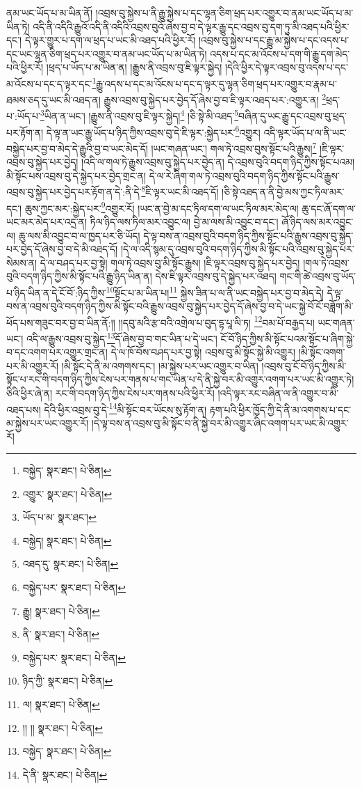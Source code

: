 ནམ་ཡང་ཡོད་པ་མ་ཡིན་ནོ། །འབྲས་བུ་སྐྱེས་པ་ནི་རྒྱུ་སྐྱེས་པ་དང་ལྷན་ཅིག་ཕྲད་པར་འགྱུར་བ་ནམ་ཡང་ཡོད་པ་མ་ཡིན་ཏེ། འདི་ནི་འདིའི་རྒྱུའོ་འདི་ནི་འདིའི་འབྲས་བུའོ་ཞེས་བྱ་བ་དེ་ལྟར་རྒྱུ་དང་འབྲས་བུ་དག་ཏུ་མི་འཐད་པའི་ཕྱིར་དང་། དེ་ལྟར་གྱུར་པ་དག་ལ་ཕྲད་པ་ཡང་མི་འཐད་པའི་ཕྱིར་རོ། །འབྲས་བུ་སྐྱེས་པ་དང་རྒྱུ་མ་སྐྱེས་པ་དང་འདས་པ་དང་ཡང་ལྷན་ཅིག་ཕྲད་པར་འགྱུར་བ་ནམ་ཡང་ཡོད་པ་མ་ཡིན་ཏེ། འདས་པ་དང་མ་འོངས་པ་དག་གི་རྒྱུ་དག་མེད་པའི་ཕྱིར་རོ། །ཕྲད་པ་ཡོད་པ་མ་ཡིན་ན། །རྒྱུས་ནི་འབྲས་བུ་ཇི་ལྟར་སྐྱེད། །དེའི་ཕྱིར་དེ་ལྟར་འབྲས་བུ་འདས་པ་དང་མ་འོངས་པ་དང་ད་ལྟར་དང་\footnote{བསྐྱེད་  སྣར་ཐང་།  པེ་ཅིན། }རྒྱུ་འདས་པ་དང་མ་འོངས་པ་དང་ད་ལྟར་དུ་ལྷན་ཅིག་ཕྲད་པར་འགྱུར་བ་རྣམ་པ་ཐམས་ཅད་དུ་ཡང་མི་འཐད་ན། རྒྱུས་འབྲས་བུ་སྐྱེད་པར་བྱེད་དོ་ཞེས་བྱ་བ་ཇི་ལྟར་འཐད་པར་:འགྱུར་ན། \footnote{འགྱུར་  སྣར་ཐང་།  པེ་ཅིན། }ཕྲད་པ་:ཡོད་པ་\footnote{ཡོད་པ་མ་  སྣར་ཐང་། }ཡིན་ན་ཡང་། །རྒྱུས་ནི་འབྲས་བུ་ཇི་ལྟར་སྐྱེད།\footnote{བསྐྱེད།  སྣར་ཐང་།  པེ་ཅིན། } །ཅི་སྟེ་མི་འཐད་\footnote{འཐད་དུ་  སྣར་ཐང་།  པེ་ཅིན། }བཞིན་དུ་ཡང་རྒྱུ་དང་འབྲས་བུ་ཕྲད་པར་རྟོག་ན། དེ་ལྟ་ན་ཡང་རྒྱུ་ཡོད་པ་ཉིད་ཀྱིས་འབྲས་བུ་དེ་ཇི་ལྟར་:སྐྱེད་པར་\footnote{བསྐྱེད་པར་  སྣར་ཐང་།  པེ་ཅིན། }འགྱུར། འདི་ལྟར་ཡོད་པ་ལ་ནི་ཡང་བསྐྱེད་པར་བྱ་བ་མེད་དེ་རྒྱུའི་བྱ་བ་ཡང་མེད་དོ། །ཡང་གཞན་ཡང་། གལ་ཏེ་འབྲས་བུས་སྟོང་པའི་རྒྱུས།\footnote{རྒྱུ།  སྣར་ཐང་།  པེ་ཅིན། } །ཇི་ལྟར་འབྲས་བུ་སྐྱེད་པར་བྱེད། །འདི་ལ་གལ་ཏེ་རྒྱུས་འབྲས་བུ་སྐྱེད་པར་བྱེད་ན། དེ་འབྲས་བུའི་བདག་ཉིད་ཀྱིས་སྟོང་པའམ། མི་སྟོང་པས་འབྲས་བུ་དེ་སྐྱེད་པར་བྱེད་གྲང་ན། དེ་ལ་རེ་ཞིག་གལ་ཏེ་འབྲས་བུའི་བདག་ཉིད་ཀྱིས་སྟོང་པའི་རྒྱུས་འབྲས་བུ་སྐྱེད་པར་བྱེད་པར་རྟོག་ན་དེ་:ནི་དེ་\footnote{ནི་  སྣར་ཐང་།  པེ་ཅིན། }ཇི་ལྟར་ཡང་མི་འཐད་དོ། །ཅི་སྟེ་འཐད་ན་ནི་བྱེ་མས་ཀྱང་ཏིལ་མར་དང་། ཆུས་ཀྱང་མར་:སྐྱེད་པར་\footnote{བསྐྱེད་པར་  སྣར་ཐང་།  པེ་ཅིན། }འགྱུར་རོ། །ཡང་ན་བྱེ་མ་དང་ཏིལ་དག་ལ་ཡང་ཏིལ་མར་མེད་ལ། ཆུ་དང་ཞོ་དག་ལ་ཡང་མར་མེད་པར་འདྲ་ན། ཏིལ་ཉིད་ལས་ཏིལ་མར་འབྱུང་ལ། བྱེ་མ་ལས་མི་འབྱུང་བ་དང་། ཞོ་ཉིད་ལས་མར་འབྱུང་ལ། ཆུ་ལས་མི་འབྱུང་བ་ལ་ཁྱད་པར་ཅི་ཡོད། དེ་ལྟ་བས་ན་འབྲས་བུའི་བདག་ཉིད་ཀྱིས་སྟོང་པའི་རྒྱུས་འབྲས་བུ་སྐྱེད་པར་བྱེད་དོ་ཞེས་བྱ་བ་དེ་མི་འཐད་དོ། །དེ་ལ་འདི་སྙམ་དུ་འབྲས་བུའི་བདག་ཉིད་ཀྱིས་མི་སྟོང་པའི་འབྲས་བུ་སྐྱེད་པར་སེམས་ན། དེ་ལ་བཤད་པར་བྱ་སྟེ། གལ་ཏེ་འབྲས་བུ་མི་སྟོང་རྒྱུས། །ཇི་ལྟར་འབྲས་བུ་སྐྱེད་པར་བྱེད། །གལ་ཏེ་འབྲས་བུའི་བདག་ཉིད་ཀྱིས་མི་སྟོང་པའི་རྒྱུ་ཉིད་ཡིན་ན། དེས་ཇི་ལྟར་འབྲས་བུ་དེ་སྐྱེད་པར་འཐད། གང་གི་ཚེ་འབྲས་བུ་ཡོད་པ་ཉིད་ཡིན་ན་དེ་ངོ་བོ་:ཉིད་ཀྱིས་\footnote{ཉིད་ཀྱི་  སྣར་ཐང་།  པེ་ཅིན། }སྟོང་པ་མ་ཡིན་པ།\footnote{ལ།  སྣར་ཐང་།  པེ་ཅིན། } སྐྱེས་ཟིན་པ་ལ་ནི་ཡང་བསྐྱེད་པར་བྱ་བ་མེད་དེ། དེ་ལྟ་བས་ན་འབྲས་བུའི་བདག་ཉིད་ཀྱིས་མི་སྟོང་བའི་རྒྱུས་འབྲས་བུ་སྐྱེད་པར་བྱེད་དོ་ཞེས་བྱ་བ་དེ་ཡང་སྐྱེ་བོ་ངོ་བཟློག་མི་ཕོད་པས་གཟུང་བར་བྱ་བ་ཡིན་ནོ:།། །།དབུ་མའི་རྩ་བའི་འགྲེལ་པ་བུད་དྷ་པཱ་ལི་ཏ། \footnote{།། །།   སྣར་ཐང་།  པེ་ཅིན། }བམ་པོ་བརྒྱད་པ། ཡང་གཞན་ཡང་། འདི་ལ་རྒྱུས་འབྲས་བུ་སྐྱེད་\footnote{བསྐྱེད་  སྣར་ཐང་།  པེ་ཅིན། }དོ་ཞེས་བྱ་བ་གང་ཡིན་པ་དེ་ཡང་། ངོ་བོ་ཉིད་ཀྱིས་མི་སྟོང་པའམ་སྟོང་པ་ཞིག་སྐྱེ་བ་དང་འགག་པར་འགྱུར་གྲང་ན། དེ་ལ་ཁོ་བོས་བཤད་པར་བྱ་སྟེ། འབྲས་བུ་མི་སྟོང་སྐྱེ་མི་འགྱུར། །མི་སྟོང་འགག་པར་མི་འགྱུར་རོ། །མི་སྟོང་དེ་ནི་མ་འགགས་དང་། །མ་སྐྱེས་པར་ཡང་འགྱུར་བ་ཡིན། །འབྲས་བུ་ངོ་བོ་ཉིད་ཀྱིས་མི་སྟོང་པ་རང་གི་བདག་ཉིད་ཀྱིས་ངེས་པར་གནས་པ་གང་ཡིན་པ་དེ་ནི་སྐྱེ་བར་མི་འགྱུར་འགག་པར་ཡང་མི་འགྱུར་ཏེ། ཅིའི་ཕྱིར་ཞེ་ན། རང་གི་བདག་ཉིད་ཀྱིས་ངེས་པར་གནས་པའི་ཕྱིར་རོ། །འདི་ལྟར་རང་བཞིན་ལ་ནི་འགྱུར་བ་མི་འཐད་པས། དེའི་ཕྱིར་འབྲས་བུ་དེ་\footnote{དེ་ནི་  སྣར་ཐང་།  པེ་ཅིན། }མི་སྟོང་བར་ཡོངས་སུ་རྟོག་ན། རྟག་པའི་ཕྱིར་ཁྱོད་ཀྱི་དེ་ནི་མ་འགགས་པ་དང་མ་སྐྱེས་པར་ཡང་འགྱུར་རོ། །དེ་ལྟ་བས་ན་འབྲས་བུ་མི་སྟོང་བ་ནི་སྐྱེ་བར་མི་འགྱུར་ཞིང་འགག་པར་ཡང་མི་འགྱུར་རོ། 